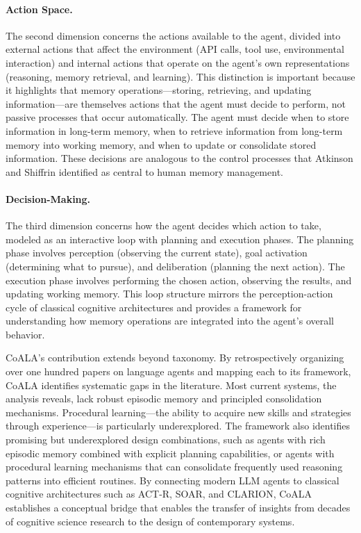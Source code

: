 \documentclass[11pt,letterpaper]{article}
\begin{document}
\paragraph{Action Space.} The second dimension concerns the actions available to the agent, divided into external actions that affect the environment (API calls, tool use, environmental interaction) and internal actions that operate on the agent's own representations (reasoning, memory retrieval, and learning). This distinction is important because it highlights that memory operations---storing, retrieving, and updating information---are themselves actions that the agent must decide to perform, not passive processes that occur automatically. The agent must decide when to store information in long-term memory, when to retrieve information from long-term memory into working memory, and when to update or consolidate stored information. These decisions are analogous to the control processes that Atkinson and Shiffrin identified as central to human memory management.

\paragraph{Decision-Making.} The third dimension concerns how the agent decides which action to take, modeled as an interactive loop with planning and execution phases. The planning phase involves perception (observing the current state), goal activation (determining what to pursue), and deliberation (planning the next action). The execution phase involves performing the chosen action, observing the results, and updating working memory. This loop structure mirrors the perception-action cycle of classical cognitive architectures and provides a framework for understanding how memory operations are integrated into the agent's overall behavior.

CoALA's contribution extends beyond taxonomy. By retrospectively organizing over one hundred papers on language agents and mapping each to its framework, CoALA identifies systematic gaps in the literature. Most current systems, the analysis reveals, lack robust episodic memory and principled consolidation mechanisms. Procedural learning---the ability to acquire new skills and strategies through experience---is particularly underexplored. The framework also identifies promising but underexplored design combinations, such as agents with rich episodic memory combined with explicit planning capabilities, or agents with procedural learning mechanisms that can consolidate frequently used reasoning patterns into efficient routines. By connecting modern LLM agents to classical cognitive architectures such as ACT-R, SOAR, and CLARION, CoALA establishes a conceptual bridge that enables the transfer of insights from decades of cognitive science research to the design of contemporary systems.
\end{document}
